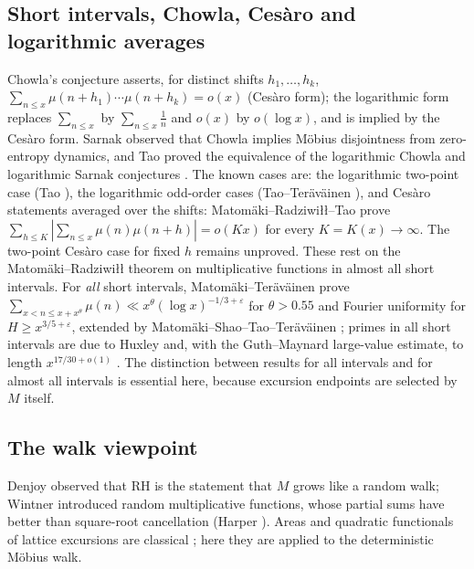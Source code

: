\documentclass[11pt]{amsart}
\numberwithin{equation}{section}
\theoremstyle{plain}
\theoremstyle{definition}
\theoremstyle{remark}
\newcommand{\eps}{\varepsilon}
\begin{document}
\subsection{Short intervals, Chowla, Cesàro and logarithmic averages}
Chowla's conjecture \cite{Chowla1965} asserts, for distinct shifts
$h_1,\dots,h_k$, $\sum_{n\le x}\mu(n+h_1)\cdots\mu(n+h_k)=o(x)$ (Cesàro form);
the logarithmic form replaces $\sum_{n\le x}$ by $\sum_{n\le x}\frac1n$ and
$o(x)$ by $o(\log x)$, and is implied by the Cesàro form. Sarnak
\cite{Sarnak2010} observed that Chowla implies Möbius disjointness from
zero-entropy dynamics, and Tao proved the equivalence of the logarithmic
Chowla and logarithmic Sarnak conjectures \cite{Tao2017}. The known cases
are: the logarithmic two-point case (Tao \cite{Tao2016}), the logarithmic
odd-order cases (Tao--Teräväinen \cite{TaoTeravainen2018,TaoTeravainen2019}),
and Cesàro statements averaged over the shifts: Matomäki--Radziwiłł--Tao
\cite{MRT15} prove $\sum_{h\le K}|\sum_{n\le x}\mu(n)\mu(n+h)|=o(Kx)$ for
every $K=K(x)\to\infty$. The two-point Cesàro case for fixed $h$ remains
unproved. These rest on the Matomäki--Radziwiłł theorem \cite{MR16} on
multiplicative functions in almost all short intervals. For \emph{all}
short intervals, Matomäki--Teräväinen \cite{MatomakiTeravainen2023} prove
$\sum_{x<n\le x+x^\theta}\mu(n)\ll x^\theta(\log x)^{-1/3+\eps}$ for
$\theta>0.55$ and Fourier uniformity for $H\ge x^{3/5+\eps}$, extended by
Matomäki--Shao--Tao--Teräväinen \cite{MSTT23}; primes in all short intervals
are due to Huxley \cite{Huxley1972} and, with the Guth--Maynard large-value
estimate, to length $x^{17/30+o(1)}$ \cite{GuthMaynard2026}. The distinction
between results for all intervals and for almost all intervals is essential
here, because excursion endpoints are selected by $M$ itself.

\subsection{The walk viewpoint}
\label{subsec:intro-walk}
Denjoy \cite{Denjoy1931} observed that RH is the statement that $M$ grows
like a random walk; Wintner \cite{Wintner1944} introduced random
multiplicative functions, whose partial sums have better than square-root
cancellation (Harper \cite{Harper2020}). Areas and quadratic functionals of
lattice excursions are classical
\cite{Takacs91,NguyenThe04,Richard05,Janson07,DKW15,CP17}; here they are
applied to the deterministic Möbius walk.
\end{document}
